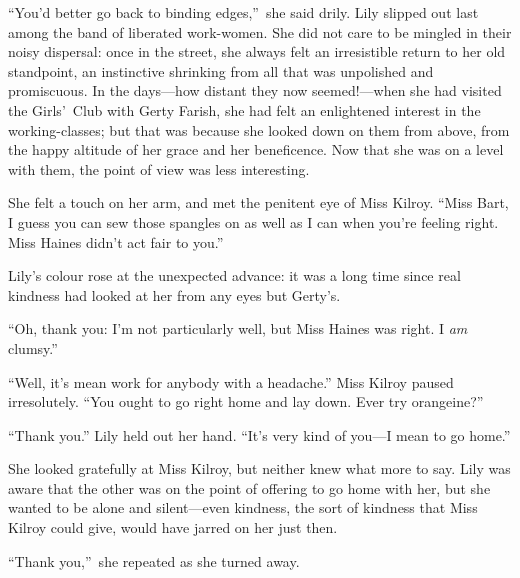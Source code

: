 \documentclass[12pt,a4paper]{book}
\begin{document}
``You'd better go back to binding edges,''\ she said drily. Lily
slipped out last among the band of liberated work-women. She did
not care to be mingled in their noisy dispersal: once in the
street, she always felt an irresistible return to her old
standpoint, an instinctive shrinking from all that was unpolished
and promiscuous. In the days---how distant they now
seemed!---when she had visited the Girls'\ Club with Gerty Farish,
she had felt an enlightened interest in the working-classes; but
that was because she looked down on them from above, from the
happy altitude of her grace and her beneficence. Now that she was
on a level with them, the point of view was less interesting.





She felt a touch on her arm, and met the penitent eye of Miss
Kilroy. ``Miss Bart, I guess you can sew those spangles on as well
as I can when you're feeling right. Miss Haines didn't act fair
to you.''





Lily's colour rose at the unexpected advance: it was a long time
since real kindness had looked at her from any eyes but Gerty's.





``Oh, thank you: I'm not particularly well, but Miss Haines was
right. I \textit{am} clumsy.''





``Well, it's mean work for anybody with a headache.'' Miss Kilroy
paused irresolutely. ``You ought to go right home and lay down. 
Ever try orangeine?''





``Thank you.'' Lily held out her hand. ``It's very kind of you---I
mean to go home.''





She looked gratefully at Miss Kilroy, but neither knew what more
to say. Lily was aware that the other was on the point of
offering to go home with her, but she wanted to be alone and
silent---even kindness, the sort of kindness that Miss Kilroy
could give, would have jarred on her just then.





``Thank you,''\ she repeated as she turned away.
\end{document}
